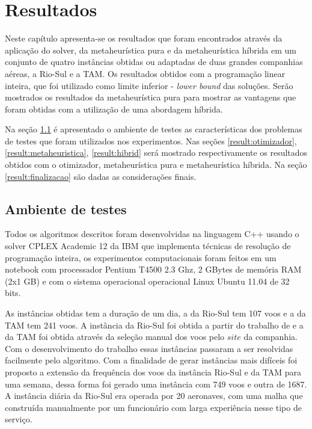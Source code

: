   \chapter{Resultados}


Neste capítulo apresenta-se os resultados que foram encontrados através da
aplicação do solver, da metaheurística pura e da metaheurística híbrida em um
conjunto de quatro instâncias obtidas ou adaptadas de duas grandes companhias
aéreas, a Rio-Sul e a TAM. Os resultados obtidos com a programação linear
inteira, que foi utilizado como limite inferior - \textit{lower bound} das
soluções. Serão mostrados os resultados da metaheurística pura para mostrar as
vantagens que foram obtidas com a utilização de uma abordagem híbrida.

Na seção \ref{result:ambiente} é apresentado o ambiente de testes as
características dos problemas de testes que foram utilizados nos
experimentos. Nas seções \ref{result:otimizador}, \ref{result:metaheuristica},
\ref{result:hibrid} será mostrado respectivamente os resultados obtidos com o
otimizador, metaheurística pura e metaheurística híbrida. Na seção
\ref{result:finalizacao} são dadas as considerações finais.

\section{Ambiente de testes} \label{result:ambiente}

Todos os algoritmos descritos foram desenvolvidas na linguagem C++ usando o
solver CPLEX Academic 12 da IBM que implementa técnicas de resolução de
programação inteira, os experimentos computacionais foram feitos em um
notebook com processador Pentium T4500 2.3 Ghz, 2 GBytes de memória RAM (2x1 GB)
e com o sistema operacional operacional Linux Ubuntu 11.04 de 32 bits.

As instâncias obtidas tem a duração de um dia, a da Rio-Sul tem 107
voos e a da TAM tem 241 voos. A instância da Rio-Sul foi obtida a partir do
trabalho de \cite{pontes2002} e a da TAM foi obtida através da seleção manual dos voos
pelo $site$ da companhia. Com o desenvolvimento do trabalho essas
instâncias passaram a ser resolvidas facilmente pelo algoritmo. Com a finalidade
de gerar instâncias mais difíceis foi proposto a extensão da frequência dos
voos da instância Rio-Sul e da TAM para uma semana, dessa forma foi gerado uma
instância com 749 voos e outra de 1687. A instância diária da Rio-Sul era
operada por 20 aeronaves, com uma malha que construída manualmente por um
funcionário com larga experiência nesse tipo de serviço.

